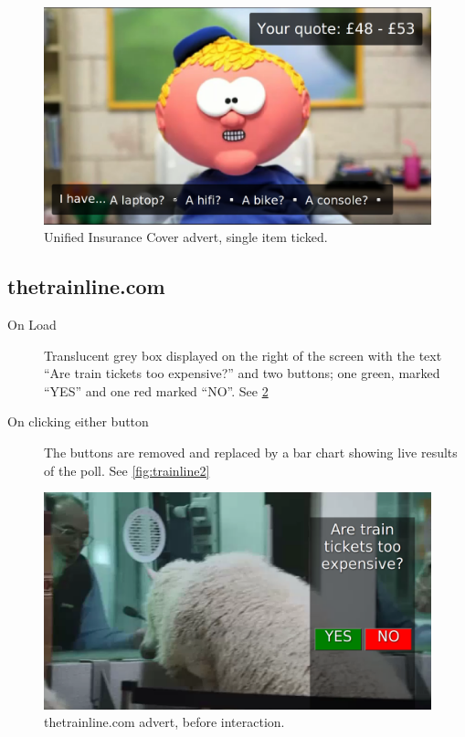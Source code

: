 	\begin{figure}[th]
		\centering
		\includegraphics[width=\textwidth,height=0.5\textheight,keepaspectratio]{images/adverts/unified_insurance_cover-7.png}
		\caption{Unified Insurance Cover advert, single item ticked.}
		\label{fig:Paddy7}
	\end{figure}	
	
\subsection{thetrainline.com}
	\begin{description}
		\item[On Load]{Translucent grey box displayed on the right of the screen with the text ``Are train tickets too expensive?'' and two buttons; one green, marked ``YES'' and one red marked ``NO''. See \ref{fig:trainline1}}
		\item[On clicking either button]{The buttons are removed and replaced by a bar chart showing live results of the poll. See \ref{fig:trainline2}}
	\end{description}
	
	\begin{figure}[th]
		\centering
		\includegraphics[width=\textwidth,height=0.5\textheight,keepaspectratio]{images/adverts/trainline-1.png}
		\caption{thetrainline.com advert, before interaction.}
		\label{fig:trainline1}
	\end{figure}
	
